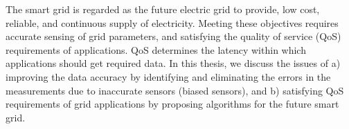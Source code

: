 The smart grid is regarded as the future electric grid to provide, low cost, reliable, and continuous supply of electricity. Meeting these objectives requires accurate sensing of grid parameters, and satisfying the quality of service (QoS) requirements of applications. QoS determines the latency within which applications should get required data.  
In this thesis, we discuss the issues of a) improving the data accuracy by identifying and eliminating the errors in the measurements due to inaccurate sensors (biased sensors), and b) satisfying QoS requirements of grid applications by proposing algorithms for the future smart grid. 

